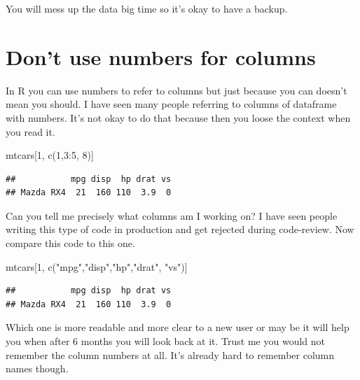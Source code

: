 \documentclass[
]{book}
\newenvironment{Shaded}{\begin{snugshade}}{\end{snugshade}}
\newcommand{\DecValTok}[1]{\textcolor[rgb]{0.00,0.00,0.81}{#1}}
\newcommand{\FunctionTok}[1]{\textcolor[rgb]{0.00,0.00,0.00}{#1}}
\newcommand{\NormalTok}[1]{#1}
\newcommand{\SpecialCharTok}[1]{\textcolor[rgb]{0.00,0.00,0.00}{#1}}
\newcommand{\StringTok}[1]{\textcolor[rgb]{0.31,0.60,0.02}{#1}}
\begin{document}
You will mess up the data big time so it's okay to have a backup.

\hypertarget{dont-use-numbers-for-columns}{%
\section{Don't use numbers for columns}\label{dont-use-numbers-for-columns}}

In R you can use numbers to refer to columns but just because you can doesn't mean you should. I have seen many people referring to columns of dataframe with numbers. It's not okay to do that because then you loose the context when you read it.

\begin{Shaded}
\begin{Highlighting}[]
\NormalTok{mtcars[}\DecValTok{1}\NormalTok{, }\FunctionTok{c}\NormalTok{(}\DecValTok{1}\NormalTok{,}\DecValTok{3}\SpecialCharTok{:}\DecValTok{5}\NormalTok{, }\DecValTok{8}\NormalTok{)]}
\end{Highlighting}
\end{Shaded}

\begin{verbatim}
##           mpg disp  hp drat vs
## Mazda RX4  21  160 110  3.9  0
\end{verbatim}

Can you tell me precisely what columns am I working on? I have seen people writing this type of code in production and get rejected during code-review. Now compare this code to this one.

\begin{Shaded}
\begin{Highlighting}[]
\NormalTok{mtcars[}\DecValTok{1}\NormalTok{, }\FunctionTok{c}\NormalTok{(}\StringTok{"mpg"}\NormalTok{,}\StringTok{"disp"}\NormalTok{,}\StringTok{"hp"}\NormalTok{,}\StringTok{"drat"}\NormalTok{, }\StringTok{"vs"}\NormalTok{)]}
\end{Highlighting}
\end{Shaded}

\begin{verbatim}
##           mpg disp  hp drat vs
## Mazda RX4  21  160 110  3.9  0
\end{verbatim}

Which one is more readable and more clear to a new user or may be it will help you when after 6 months you will look back at it. Trust me you would not remember the column numbers at all. It's already hard to remember column names though.
\end{document}
